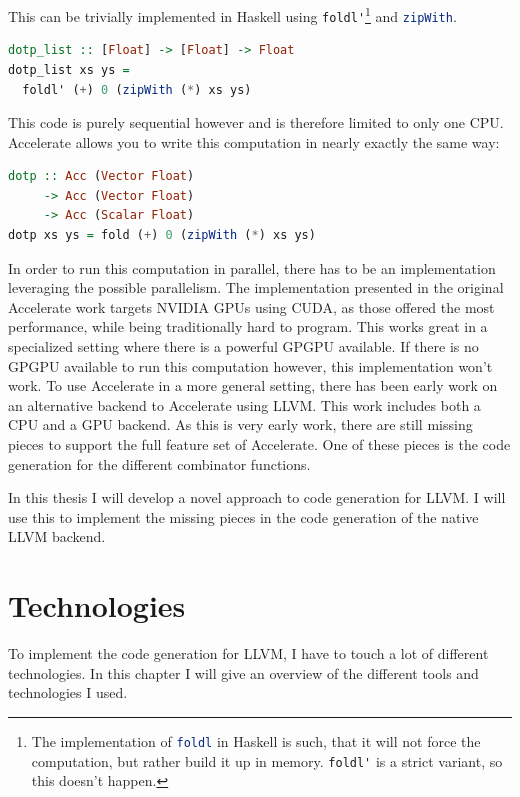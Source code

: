 \documentclass[a4paper,bibliography=totocnumbered,parskip,headsepline]{scrbook}
\begin{document}
This can be trivially implemented in Haskell using \lstinline[language=haskell]!foldl'!\footnote{The implementation of \lstinline[language=haskell]!foldl! in Haskell is such, that it will not force the computation, but rather build it up in memory. \lstinline[language=haskell]!foldl'! is a strict variant, so this doesn't happen.} and \lstinline[language=haskell]!zipWith!.
\begin{lstlisting}[language=haskell]
dotp_list :: [Float] -> [Float] -> Float
dotp_list xs ys =
  foldl' (+) 0 (zipWith (*) xs ys)
\end{lstlisting}

\begin{minipage}{\linewidth}
This code is purely sequential however and is therefore limited to only one CPU.
Accelerate allows you to write this computation in nearly exactly the same way:

\begin{lstlisting}[language=haskell]
dotp :: Acc (Vector Float)
     -> Acc (Vector Float)
     -> Acc (Scalar Float)
dotp xs ys = fold (+) 0 (zipWith (*) xs ys)
\end{lstlisting}
\end{minipage}

In order to run this computation in parallel, there has to be an implementation leveraging the possible parallelism.
The implementation presented in the original Accelerate work targets NVIDIA GPUs using CUDA, as those offered the most performance, while being traditionally hard to program.
This works great in a specialized setting where there is a powerful GPGPU available.
If there is no GPGPU available to run this computation however, this implementation won't work.
To use Accelerate in a more general setting, there has been early work on an alternative backend to Accelerate using LLVM.\cite{trevor2014llvm}
This work includes both a CPU and a GPU backend.
As this is very early work, there are still missing pieces to support the full feature set of Accelerate.
One of these pieces is the code generation for the different combinator functions.

In this thesis I will develop a novel approach to code generation for LLVM.
I will use this to implement the missing pieces in the code generation of the native LLVM backend.


\chapter{Technologies}
To implement the code generation for LLVM, I have to touch a lot of different technologies.
In this chapter I will give an overview of the different tools and technologies I used.
\end{document}
